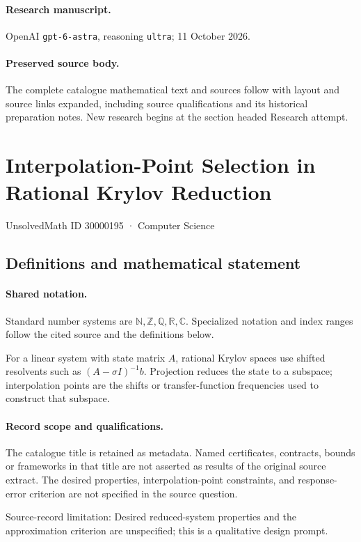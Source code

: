 \documentclass[11pt]{article}
\begin{document}
\paragraph{Research manuscript.} OpenAI \texttt{gpt-6-astra}, reasoning \texttt{ultra}; 11 October 2026.
\paragraph{Preserved source body.} The complete catalogue mathematical text and sources follow with layout and source links expanded, including source qualifications and its historical preparation notes. New research begins at the section headed Research attempt.

\section{Interpolation-Point Selection in Rational Krylov Reduction}\label{30000195}
{\small UnsolvedMath ID 30000195 · Computer Science}
\subsection{Definitions and mathematical statement}

\paragraph{Shared notation.}Standard number systems are $\mathbb N,\mathbb Z,\mathbb Q,\mathbb R,\mathbb C$. Specialized notation and index ranges follow the cited source and the definitions below.


For a linear system with state matrix $A$, rational Krylov spaces use shifted resolvents such as $(A-\sigma I)^{-1}b$. Projection reduces the state to a subspace; interpolation points are the shifts or transfer-function frequencies used to construct that subspace.
\paragraph{Record scope and qualifications.}
The catalogue title is retained as metadata. Named certificates, contracts, bounds or frameworks in that title are not asserted as results of the original source extract.
The desired properties, interpolation-point constraints, and response-error criterion are not specified in the source question.

Source-record limitation: Desired reduced-system properties and the approximation criterion are unspecified; this is a qualitative design prompt.
\end{document}
